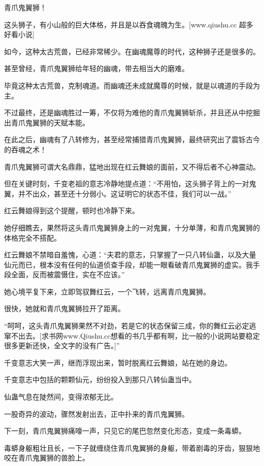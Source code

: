 
\begin{this_body}

青爪鬼翼狮！

这头狮子，有小山般的巨大体格，并且是以吞食魂魄为生。[www.qiushu.cc 超多好看小说]

如今，这种太古荒兽，已经非常稀少。在幽魂魔尊的时代，这种狮子还是很多的。

甚至曾经，青爪鬼翼狮给年轻的幽魂，带去相当大的磨难。

毕竟这种太古荒兽，克制魂道。而幽魂还未成就魔尊的时候，就是以魂道的手段为主。

不过最终，还是幽魂胜过一筹，不仅将为难他的青爪鬼翼狮斩杀，并且还从中挖掘出青爪鬼翼狮的天赋本能。

在此之后，幽魂有了八转修为，甚至经常捕猎青爪鬼翼狮，最终研究出了震铄古今的吞魂之术！

青爪鬼翼狮可谓大名鼎鼎，猛地出现在红云舞娘的面前，又不得后者不心神震动。

但在关键时刻，千变老祖的意志冷静地提点道：“不用怕，这头狮子背上的一对鬼翼，并不出众，甚至还十分弱小。这证明它的状态不佳，我们可以一战。”

红云舞娘得到这个提醒，顿时也冷静下来。

她仔细瞧去，果然将这头青爪鬼翼狮身上的一对鬼翼，十分单薄，和青爪鬼翼狮的体格完全不搭配。

红云舞娘不禁暗自羞愧，心道：“夫君的意志，只掌握了一只八转仙蛊，以及大量仙元而已，根本没有任何的仙道侦查手段，却能一眼看破青爪鬼翼狮的虚实。我手段全面，反而被震慑住，实在不应该。”

她心境平复下来，立即驾驭舞红云，一个飞转，远离青爪鬼翼狮。

很快，她就和青爪鬼翼狮拉开了距离。

“呵呵，这头青爪鬼翼狮果然不对劲，若是它的状态保留三成，你的舞红云必定逃窜不出去。[求书网www.Qiushu.cc想看的书几乎都有啊，比一般的小说网站要稳定很多更新还快，全文字的没有广告。]”

千变意志大笑一声，继而浮现出来，暂时脱离红云舞娘，站在她的身边。

千变意志中包括的颗颗仙元，纷纷投入到那只八转仙蛊当中。

仙蛊气息在陡然间，变得浓郁无比。

一股奇异的波动，骤然发射出去，正中扑来的青爪鬼翼狮。

下一刻，青爪鬼翼狮痛嚎一声，只见它的尾巴忽然变化形态，变成一条毒蟒。

毒蟒身躯粗壮且长，一下子就缠绕住青爪鬼翼狮的身躯，带着剧毒的牙齿，狠狠地咬在青爪鬼翼狮的兽脸上。


\end{this_body}
